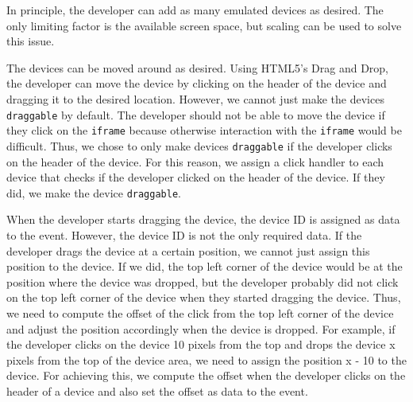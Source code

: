 In principle, the developer can add as many emulated devices as desired. The only limiting factor is the available screen space, but scaling can be used to solve this issue. 

The devices can be moved around as desired. Using HTML5's Drag and Drop, the developer can move the device by clicking on the header of the device and dragging it to the desired location. However, we cannot just make the devices \lstinline|draggable| by default. The developer should not be able to move the device if they click on the \lstinline|iframe| because otherwise interaction with the \lstinline|iframe| would be difficult. Thus, we chose to only make devices \lstinline|draggable| if the developer clicks on the header of the device. For this reason, we assign a click handler to each device that checks if the developer clicked on the header of the device. If they did, we make the device \lstinline|draggable|. 

When the developer starts dragging the device, the device ID is assigned as data to the event. However, the device ID is not the only required data. If the developer drags the device at a certain position, we cannot just assign this position to the device. If we did, the top left corner of the device would be at the position where the device was dropped, but the developer probably did not click on the top left corner of the device when they started dragging the device. Thus, we need to compute the offset of the click from the top left corner of the device and adjust the position accordingly when the device is dropped. For example, if the developer clicks on the device 10 pixels from the top and drops the device x pixels from the top of the device area, we need to assign the position x - 10 to the device. For achieving this, we compute the offset when the developer clicks on the header of a device and also set the offset as data to the event.

